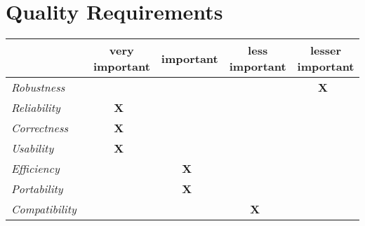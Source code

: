 \section{Quality Requirements}


\begin{center}
 \begin{tabular}{l|c|c|c|c}
  ~ & very important & important & less important & lesser important \\
  \hline \hline
  \textit{Robustness}~ &  ~ ~ ~ &  ~ ~ ~ &  ~ ~ ~ & \textbf{X}~ \\
  \hline
  \textit{Reliability}~ & \textbf{X}~ &  ~ ~ ~ &  ~ ~ ~ &  ~ ~ ~ \\
  \hline
  \textit{Correctness}~ & \textbf{X}~ &  ~ ~ ~ &  ~ ~ ~ &  ~ ~ ~ \\
  \hline
  \textit{Usability}~ & \textbf{X}~ & ~ ~ ~ &  ~ ~ ~ &  ~ ~ ~ \\
  \hline
  \textit{Efficiency}~ &  ~ ~ ~ & \textbf{X}~ &  ~ ~ ~ &  ~ ~ ~ \\
  \hline
  \textit{Portability}~ &  ~ ~ ~ & \textbf{X}~ &  ~ ~ ~ &  ~ ~ ~ \\
  \hline
  \textit{Compatibility}~ &  ~ ~ ~ &  ~ ~ ~ & \textbf{X}~ &  ~ ~ ~ \\
 \end{tabular}
\end{center}
